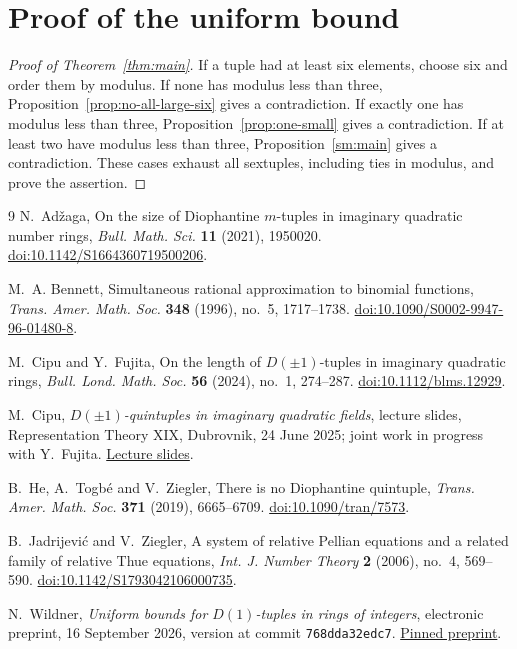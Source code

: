 \documentclass[12pt]{article}
\numberwithin{equation}{section}
\begin{document}
\section{Proof of the uniform bound}

\begin{proof}[Proof of Theorem~\ref{thm:main}]
If a tuple had at least six elements, choose six and order them by
modulus. If none has modulus less than three, Proposition~\ref{prop:no-all-large-six}
gives a contradiction. If exactly one has modulus less than three,
Proposition~\ref{prop:one-small} gives a contradiction. If at least
two have modulus less than three, Proposition~\ref{sm:main} gives a
contradiction. These cases exhaust all sextuples, including ties in
modulus, and prove the assertion.
\end{proof}

\begin{thebibliography}{9}
 N.~Ad\v zaga, On the size of Diophantine $m$-tuples in
imaginary quadratic number rings, \emph{Bull. Math. Sci.} \textbf{11}
(2021), 1950020.
\href{https://doi.org/10.1142/S1664360719500206}{doi:10.1142/S1664360719500206}.

 M.~A. Bennett, Simultaneous rational approximation
to binomial functions, \emph{Trans. Amer. Math. Soc.} \textbf{348}
(1996), no.~5, 1717--1738.
\href{https://doi.org/10.1090/S0002-9947-96-01480-8}{doi:10.1090/S0002-9947-96-01480-8}.

 M.~Cipu and Y.~Fujita, On the length of $D(\pm1)$-tuples
in imaginary quadratic rings, \emph{Bull. Lond. Math. Soc.}
\textbf{56} (2024), no.~1, 274--287.
\href{https://doi.org/10.1112/blms.12929}{doi:10.1112/blms.12929}.

 M.~Cipu, \emph{$D(\pm1)$-quintuples in imaginary
quadratic fields}, lecture slides, Representation Theory XIX,
Dubrovnik, 24 June 2025; joint work in progress with Y.~Fujita.
\href{https://web.math.pmf.unizg.hr/~congress/Dubrovnik25/Slides-NT-25/Cipu.pdf}{Lecture slides}.

 B.~He, A.~Togb\'e and V.~Ziegler, There is no
Diophantine quintuple, \emph{Trans. Amer. Math. Soc.} \textbf{371}
(2019), 6665--6709.
\href{https://doi.org/10.1090/tran/7573}{doi:10.1090/tran/7573}.

 B.~Jadrijevi\'c and V.~Ziegler, A system of relative
Pellian equations and a related family of relative Thue equations,
\emph{Int. J. Number Theory} \textbf{2} (2006), no.~4, 569--590.
\href{https://doi.org/10.1142/S1793042106000735}{doi:10.1142/S1793042106000735}.

 N.~Wildner, \emph{Uniform bounds for $D(1)$-tuples in
rings of integers}, electronic preprint, 16 September 2026,
version at commit \texttt{768dda32edc7}.
\href{https://github.com/natanaelwf/Solving-Open-Problems/blob/768dda32edc7166f9dd094b419df250b1e008531/dujella-problems-1.12-1.13/README.md}{Pinned preprint}.
\end{thebibliography}
\end{document}
